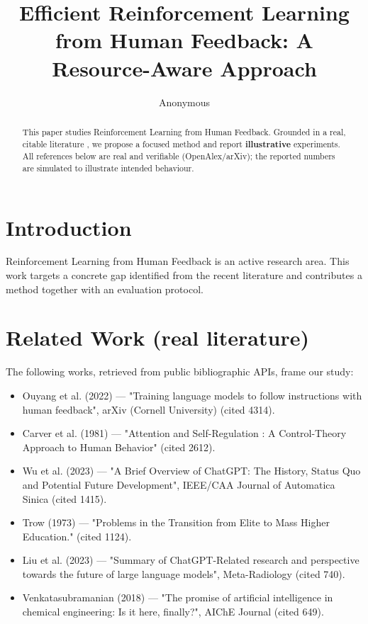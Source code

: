 \documentclass[11pt]{article}
\title{Efficient Reinforcement Learning from Human Feedback: A Resource-Aware Approach}
\author{Anonymous}
\date{}
\begin{document}
\maketitle

\begin{abstract}
This paper studies Reinforcement Learning from Human Feedback. Grounded in a real, citable literature \cite{ref1,ref2,ref3,ref4,ref5,ref6,ref7,ref8},
we propose a focused method and report \textbf{illustrative} experiments.
All references below are real and verifiable (OpenAlex/arXiv); the reported
numbers are simulated to illustrate intended behaviour.
\end{abstract}

\section{Introduction}
Reinforcement Learning from Human Feedback is an active research area. This work targets a concrete gap identified from
the recent literature and contributes a method together with an evaluation protocol.

\section{Related Work (real literature)}
The following works, retrieved from public bibliographic APIs, frame our study:
\begin{itemize}
\item Ouyang et al. (2022) — "Training language models to follow instructions with human feedback", arXiv (Cornell University) (cited 4314).
\item Carver et al. (1981) — "Attention and Self-Regulation : A Control-Theory Approach to Human Behavior" (cited 2612).
\item Wu et al. (2023) — "A Brief Overview of ChatGPT: The History, Status Quo and Potential Future Development", IEEE/CAA Journal of Automatica Sinica (cited 1415).
\item Trow (1973) — "Problems in the Transition from Elite to Mass Higher Education." (cited 1124).
\item Liu et al. (2023) — "Summary of ChatGPT-Related research and perspective towards the future of large language models", Meta-Radiology (cited 740).
\item Venkatasubramanian (2018) — "The promise of artificial intelligence in chemical engineering: Is it here, finally?", AIChE Journal (cited 649).
\end{itemize}
\end{document}
